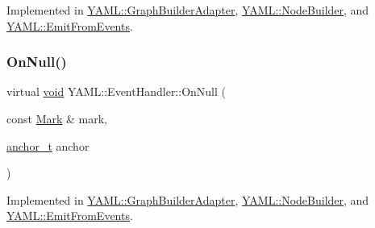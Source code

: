 Implemented in \mbox{\hyperlink{class_y_a_m_l_1_1_graph_builder_adapter_ae4fff97022af791cad7e9ef834756db6}{Y\+A\+M\+L\+::\+Graph\+Builder\+Adapter}}, \mbox{\hyperlink{class_y_a_m_l_1_1_node_builder_a8afef9632f64f0d91113a28db10b5217}{Y\+A\+M\+L\+::\+Node\+Builder}}, and \mbox{\hyperlink{class_y_a_m_l_1_1_emit_from_events_aa303f384381eb99c97563d080efc17cb}{Y\+A\+M\+L\+::\+Emit\+From\+Events}}.

\mbox{\label{class_y_a_m_l_1_1_event_handler_aca632ae43f71b6c4f13252d15191f380}} 
\subsubsection{\texorpdfstring{OnNull()}{OnNull()}}
{\footnotesize\ttfamily virtual \mbox{\hyperlink{glad_8h_a950fc91edb4504f62f1c577bf4727c29}{void}} Y\+A\+M\+L\+::\+Event\+Handler\+::\+On\+Null (\begin{DoxyParamCaption}\item[{const \mbox{\hyperlink{struct_y_a_m_l_1_1_mark}{Mark}} \&}]{mark,  }\item[{\mbox{\hyperlink{namespace_y_a_m_l_abeff1798814ae3402fc5665fdcad1de6}{anchor\+\_\+t}}}]{anchor }\end{DoxyParamCaption})\hspace{0.3cm}{\ttfamily [pure virtual]}}



Implemented in \mbox{\hyperlink{class_y_a_m_l_1_1_graph_builder_adapter_adeacb6c59aabf0622af8ed3808de9ab9}{Y\+A\+M\+L\+::\+Graph\+Builder\+Adapter}}, \mbox{\hyperlink{class_y_a_m_l_1_1_node_builder_a7fb5d6a9d2e1c1688bf0b8e1881dc5bf}{Y\+A\+M\+L\+::\+Node\+Builder}}, and \mbox{\hyperlink{class_y_a_m_l_1_1_emit_from_events_a42f9dfed68e58c2f4289550bdde5be61}{Y\+A\+M\+L\+::\+Emit\+From\+Events}}.

\mbox{\label{class_y_a_m_l_1_1_event_handler_a1f381a132754352eee6b8dcd218e3abc}} 
